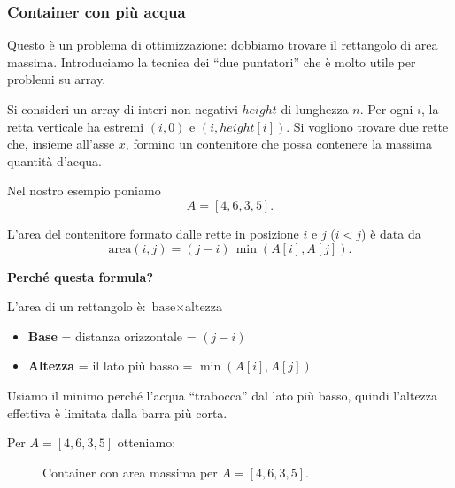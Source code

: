 \documentclass[a4paper, 11pt]{article}
\theoremstyle{definition}
\theoremstyle{remark}
\theoremstyle{remark}
\newenvironment{nota}{%
	\begin{tcolorbox}[
		colback=codebg,
		colframe=primary,
		fonttitle=\bfseries,
		title=Nota,
		left=6pt, right=6pt, top=4pt, bottom=4pt
		]
	}{%
	\end{tcolorbox}
}
\begin{document}
	\subsubsection*{Container con più acqua}
	
	\begin{softnote}
		Questo è un problema di ottimizzazione: dobbiamo trovare il rettangolo di area massima. Introduciamo la tecnica dei ``due puntatori'' che è molto utile per problemi su array.
	\end{softnote}
	
	Si consideri un array di interi non negativi $height$ di lunghezza $n$.
	Per ogni $i$, la retta verticale ha estremi $(i,0)$ e $(i,height[i])$.
	Si vogliono trovare due rette che, insieme all'asse $x$, formino un
	contenitore che possa contenere la massima quantità d'acqua.
	
	\medskip
	Nel nostro esempio poniamo
	\[
	A = [4,6,3,5].
	\]
	
	L'area del contenitore formato dalle rette in posizione $i$ e $j$
	($i < j$) è data da
	\[
	\mathrm{area}(i,j) = (j-i)\,\min(A[i],A[j]).
	\]
	
	\begin{nota}
		\textbf{Perché questa formula?}
		
		L'area di un rettangolo è: $\text{base} \times \text{altezza}$
		\begin{itemize}
			\item \textbf{Base} = distanza orizzontale = $(j-i)$
			\item \textbf{Altezza} = il lato più basso = $\min(A[i], A[j])$
		\end{itemize}
		
		Usiamo il minimo perché l'acqua ``trabocca'' dal lato più basso, quindi l'altezza effettiva è limitata dalla barra più corta.
	\end{nota}
	
	Per $A = [4,6,3,5]$ otteniamo:
	
	\begin{figure}[H]
		\centering
		\caption{Container con area massima per $A = [4,6,3,5]$.}
	\end{figure}
	
\end{document}
